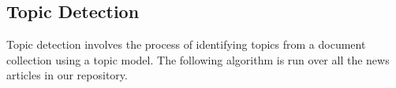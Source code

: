 \subsection{Topic Detection}
\label{topic detection}



Topic detection involves the process of identifying topics from a document collection using a topic model\cite{blei2012probabilistic}.  
The following algorithm is run over all the news articles in our repository.





